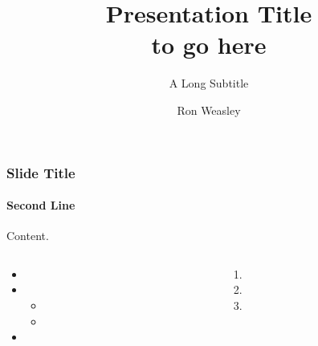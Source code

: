 \documentclass[
aspectratio=169,
]{beamer}
\title{Presentation Title\\to go here}
\subtitle{A Long Subtitle}
\author{Ron Weasley}
\institute[Computer Science]{Liverpool}
\institute{Liverpool}
\begin{document}
%
%
\begin{frame}[uolcolours=Teal Green]
\maketitle
\end{frame}

\begin{frame}[t]
    \frametitle{Slide Title}
    \framesubtitle{Second Line}

    Content.
    \lipsum[1][1-2]

    \begin{columns}[T]
        \begin{column}{0.5\textwidth}
            \begin{itemize}
                \item \lipsum[1][2]
                \item \lipsum[2][2]
                    \begin{itemize}
                        \item \lipsum[3][1]
                        \item \lipsum[4][2]
                    \end{itemize}
                \item \lipsum[5][2]
            \end{itemize}
        \end{column}

        \begin{column}{0.5\textwidth}
            \begin{enumerate}
                \item \lipsum[3][1]
                \item \lipsum[4][2]
                \item \lipsum[5][2]
            \end{enumerate}
        \end{column}
    \end{columns}
\end{frame}
\end{document}
